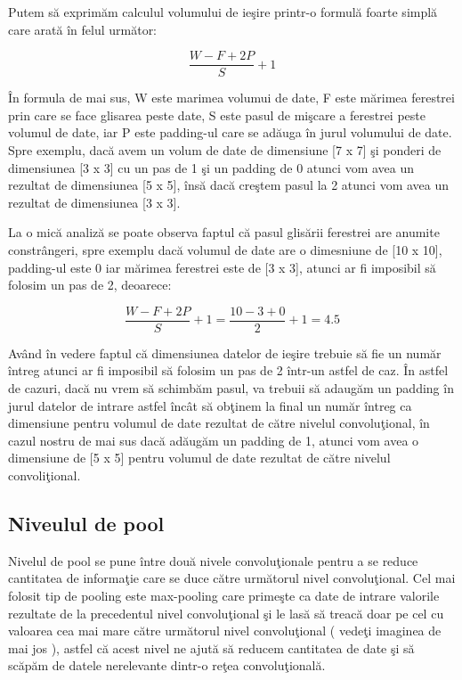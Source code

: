 Putem s\u{a} exprim\u{a}m calculul volumului de ie\c{s}ire printr-o formul\u{a} foarte simpl\u{a} care arat\u{a} \^{i}n felul urm\u{a}tor:

$$ \frac{W - F + 2P }{S} + 1 $$

\^{I}n formula de mai sus, W este marimea volumui de date, F este m\u{a}rimea ferestrei prin care se face glisarea peste date, S este pasul de mi\c{s}care a ferestrei peste volumul de date, iar P este padding-ul care se ad\u{a}uga \^{i}n jurul volumului de date. Spre exemplu, dac\u{a} avem un volum de date de dimensiune [7 x 7] \c{s}i ponderi de dimensiunea [3 x 3] cu un pas de 1 \c{s}i un padding de 0 atunci vom avea un rezultat de dimensiunea [5 x 5], \^{i}ns\u{a} dac\u{a} cre\c{s}tem pasul la 2 atunci vom avea un rezultat de dimensiunea [3 x 3].

\par

La o mic\u{a} analiz\u{a} se poate observa faptul c\u{a} pasul glis\u{a}rii ferestrei are anumite constr\^{a}ngeri, spre exemplu dac\u{a} volumul de date are o dimesniune de [10 x 10], padding-ul este 0 iar m\u{a}rimea ferestrei este de [3 x 3], atunci ar fi imposibil s\u{a} folosim un pas de 2, deoarece:

$$ \frac{W - F + 2P }{S} + 1 = \frac{10 - 3 + 0 }{2} + 1 = 4.5 $$

Av\^{a}nd \^{i}n vedere faptul c\u{a} dimensiunea datelor de ie\c{s}ire trebuie s\u{a} fie un num\u{a}r \^{i}ntreg atunci ar fi imposibil s\u{a} folosim un pas de 2 \^{i}ntr-un astfel de caz. \^{I}n astfel de cazuri, dac\u{a} nu vrem s\u{a} schimb\u{a}m pasul, va trebuii s\u{a} adaug\u{a}m un padding \^{i}n jurul datelor de intrare astfel \^{i}nc\^{a}t s\u{a} ob\c{t}inem la final un num\u{a}r \^{i}ntreg ca dimensiune pentru volumul de date rezultat de c\u{a}tre nivelul convolu\c{t}ional, \^{i}n cazul nostru de mai sus dac\u{a} ad\u{a}ug\u{a}m un padding de 1, atunci vom avea  o dimensiune de [5 x 5] pentru volumul de date rezultat de c\u{a}tre nivelul convoli\c{t}ional.

\subsection{Niveulul de pool}

Nivelul de pool se pune \^{i}ntre dou\u{a} nivele convolu\c{t}ionale pentru a se reduce cantitatea de informa\c{t}ie care se duce c\u{a}tre urm\u{a}torul nivel convolu\c{t}ional. Cel mai folosit tip de pooling este max-pooling care prime\c{s}te ca date de intrare valorile rezultate de la precedentul nivel convolu\c{t}ional \c{s}i le las\u{a} s\u{a} treac\u{a} doar pe cel cu valoarea cea mai mare c\u{a}tre urm\u{a}torul nivel convolu\c{t}ional ( vede\c{t}i imaginea de mai jos ), astfel c\u{a} acest nivel ne ajut\u{a} s\u{a} reducem cantitatea de date \c{s}i s\u{a} sc\u{a}p\u{a}m de datele nerelevante dintr-o re\c{t}ea convolu\c{t}ional\u{a}. 

